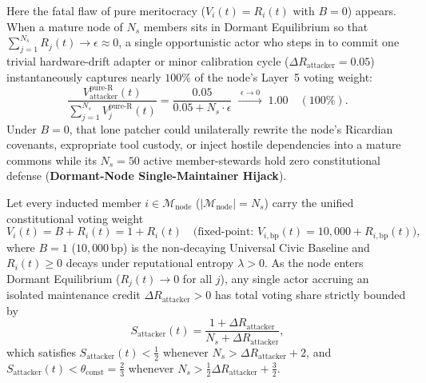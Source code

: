 Here the fatal flaw of pure meritocracy ($V_i(t) = R_i(t)$ with $B = 0$) appears. When a mature
node of $N_s$ members sits in Dormant Equilibrium so that $\sum_{j=1}^{N_s} R_j(t) \to \epsilon \approx 0$,
a single opportunistic actor who steps in to commit one trivial hardware-drift adapter or minor
calibration cycle ($\Delta R_{\mathrm{attacker}} = 0.05$) instantaneously captures nearly $100\%$
of the node's Layer~5 voting weight:
\[
    \frac{V_{\mathrm{attacker}}^{\mathrm{pure\text{-}R}}(t)}{\sum_{j=1}^{N_s} V_j^{\mathrm{pure\text{-}R}}(t)}
    = \frac{0.05}{0.05 + N_s \cdot \epsilon} \;\xrightarrow{\;\epsilon \to 0\;}\; 1.00 \quad (100\%).
\]
Under $B = 0$, that lone patcher could unilaterally rewrite the node's Ricardian covenants,
expropriate tool custody, or inject hostile dependencies into a mature commons while its $N_s = 50$
active member-stewards hold zero constitutional defense (\textbf{Dormant-Node Single-Maintainer
Hijack}).

\begin{theorem}[Immunity to Dormant-Node Single-Maintainer Hijack Under $V_i(t) = 1 + R_i(t)$]
\label{thm:ch1-dormant-hijack-immunity}
Let every inducted member $i \in \mathcal{M}_{\mathrm{node}}$ ($|\mathcal{M}_{\mathrm{node}}| = N_s$)
carry the unified constitutional voting weight
\[
    V_i(t) = B + R_i(t) = 1 + R_i(t) \quad
    \bigl(\text{fixed-point: } V_{i,\mathrm{bp}}(t) = 10{,}000 + R_{i,\mathrm{bp}}(t)\bigr),
\]
where $B = 1$ ($10{,}000\,\mathrm{bp}$) is the non-decaying Universal Civic Baseline and
$R_i(t) \ge 0$ decays under reputational entropy $\lambda > 0$. As the node enters Dormant
Equilibrium ($R_j(t) \to 0$ for all $j$), any single actor accruing an isolated maintenance credit
$\Delta R_{\mathrm{attacker}} > 0$ has total voting share strictly bounded by
\[
    S_{\mathrm{attacker}}(t) = \frac{1 + \Delta R_{\mathrm{attacker}}}{N_s + \Delta R_{\mathrm{attacker}}},
\]
which satisfies $S_{\mathrm{attacker}}(t) < \frac{1}{2}$ whenever $N_s > \Delta R_{\mathrm{attacker}} + 2$,
and $S_{\mathrm{attacker}}(t) < \theta_{\mathrm{const}} = \frac{2}{3}$ whenever
$N_s > \frac{1}{2}\Delta R_{\mathrm{attacker}} + \frac{3}{2}$.
\end{theorem}

